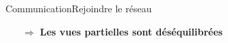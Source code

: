 \begin{frame}{Communication}{Rejoindre le réseau}



  
  \vspace{1cm}
  
  \large
  \begin{itemize}
  \item [$\Rightarrow$] \textbf{Les vues partielles sont déséquilibrées}
  \end{itemize}

\end{frame}

